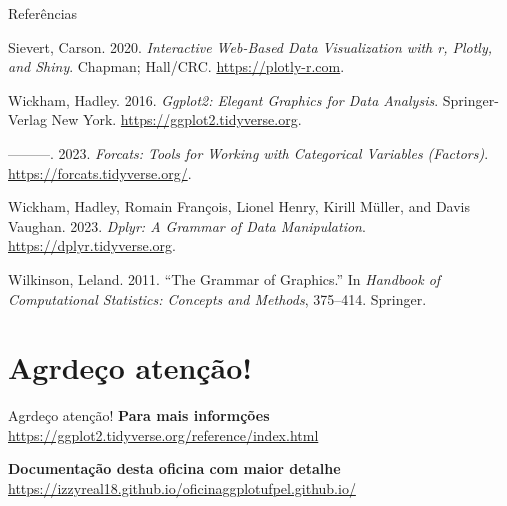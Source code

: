 \documentclass[
  ignorenonframetext,
]{beamer}
\newlength{\cslhangindent}
\newenvironment{CSLReferences}[2] %
 {\begin{list}{}{%
  \setlength{\itemindent}{0pt}
  \setlength{\leftmargin}{0pt}
  \setlength{\parsep}{0pt}
  \ifodd #1
   \setlength{\leftmargin}{\cslhangindent}
   \setlength{\itemindent}{-1\cslhangindent}
  \fi
  \setlength{\itemsep}{#2\baselineskip}}}
 {\end{list}}
\begin{document}
\begin{frame}{Referências}
\label{referuxeancias}
\label{refs}
\begin{CSLReferences}{1}{0}
Sievert, Carson. 2020. \emph{Interactive Web-Based Data Visualization
with r, Plotly, and Shiny}. Chapman; Hall/CRC.
\url{https://plotly-r.com}.

Wickham, Hadley. 2016. \emph{Ggplot2: Elegant Graphics for Data
Analysis}. Springer-Verlag New York.
\url{https://ggplot2.tidyverse.org}.

---------. 2023. \emph{Forcats: Tools for Working with Categorical
Variables (Factors)}. \url{https://forcats.tidyverse.org/}.

Wickham, Hadley, Romain François, Lionel Henry, Kirill Müller, and Davis
Vaughan. 2023. \emph{Dplyr: A Grammar of Data Manipulation}.
\url{https://dplyr.tidyverse.org}.

Wilkinson, Leland. 2011. {``The Grammar of Graphics.''} In
\emph{Handbook of Computational Statistics: Concepts and Methods},
375--414. Springer.

\end{CSLReferences}
\end{frame}

\section{Agrdeço atenção!}\label{agrdeuxe7o-atenuxe7uxe3o}

\begin{frame}{Agrdeço atenção!}
\textbf{Para mais informções}
\url{https://ggplot2.tidyverse.org/reference/index.html}

\textbf{Documentação desta oficina com maior detalhe}
\url{https://izzyreal18.github.io/oficinaggplotufpel.github.io/}
\end{frame}
\end{document}
